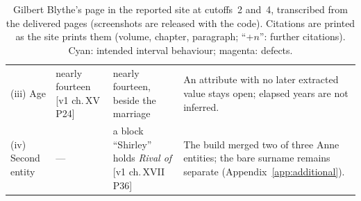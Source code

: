 \begin{table}[t]
\begin{tabular}{@{}>{\raggedright\arraybackslash}p{2.35cm}>{\raggedright\arraybackslash}p{3.85cm}>{\raggedright\arraybackslash}p{4.45cm}>{\raggedright\arraybackslash}p{4.45cm}@{}}
(iii) Age & nearly fourteen [v1 ch.\,XV P24] & nearly fourteen, beside the marriage & An attribute with no later extracted value stays open; elapsed years are not inferred. \\
(iv) Second entity & --- & a block ``Shirley'' holds \emph{Rival of} [v1 ch.\,XVII P36] & The build merged two of three Anne entities; the bare surname remains separate (Appendix~\ref{app:additional}). \\
\bottomrule
\end{tabular}
\caption{Gilbert Blythe's page in the reported \sys site at cutoffs~2 and~4, transcribed from
the delivered pages (screenshots are released with the code). Citations are printed as the
site prints them (volume, chapter, paragraph; ``+$n$'': further citations). Cyan: intended
interval behaviour; magenta: defects.}
\label{tab:qual-diff}\label{fig:qual-overview}\label{fig:qual-rel}
\end{table}
